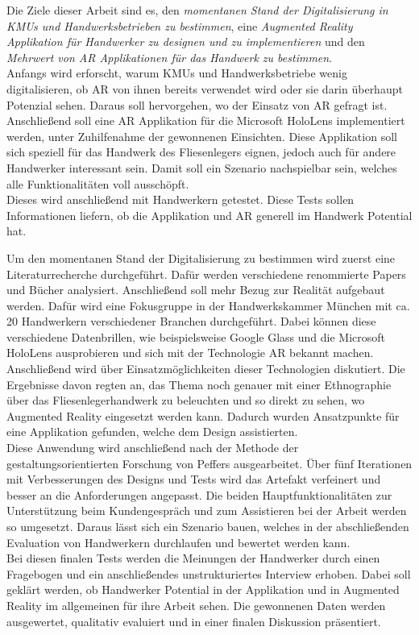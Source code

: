 Die Ziele dieser Arbeit sind es, den \textit{momentanen Stand der Digitalisierung in KMUs und Handwerksbetrieben zu bestimmen}, eine \textit{Augmented Reality Applikation für Handwerker zu designen und zu implementieren} und den \textit{Mehrwert von AR Applikationen für das Handwerk zu bestimmen}. \\
Anfangs wird erforscht, warum KMUs und Handwerksbetriebe wenig digitalisieren, ob AR von ihnen bereits verwendet wird oder sie darin überhaupt Potenzial sehen. Daraus soll hervorgehen, wo der Einsatz von AR gefragt ist. \\
Anschließend soll eine AR Applikation für die Microsoft HoloLens implementiert werden, unter Zuhilfenahme der gewonnenen Einsichten. Diese Applikation soll sich speziell für das Handwerk des Fliesenlegers eignen, jedoch auch für andere Handwerker interessant sein. Damit soll ein Szenario nachspielbar sein, welches alle Funktionalitäten voll ausschöpft. \\
Dieses wird anschließend mit Handwerkern getestet. Diese Tests sollen Informationen liefern, ob die Applikation und AR generell im Handwerk Potential hat.

Um den momentanen Stand der Digitalisierung zu bestimmen wird zuerst eine Literaturrecherche durchgeführt. Dafür werden verschiedene renommierte Papers und Bücher analysiert. Anschließend soll mehr Bezug zur Realität aufgebaut werden. Dafür wird eine Fokusgruppe in der Handwerkskammer München mit ca. 20 Handwerkern verschiedener Branchen durchgeführt. Dabei können diese verschiedene Datenbrillen, wie beispielsweise Google Glass und die Microsoft HoloLens ausprobieren und sich mit der Technologie AR bekannt machen. Anschließend wird über Einsatzmöglichkeiten dieser Technologien diskutiert. Die Ergebnisse davon regten an, das Thema noch genauer mit einer Ethnographie über das Fliesenlegerhandwerk zu beleuchten und so direkt zu sehen, wo Augmented Reality eingesetzt werden kann. Dadurch wurden Ansatzpunkte für eine Applikation gefunden, welche dem Design assistierten. \\
Diese Anwendung wird anschließend nach der Methode der gestaltungsorientierten Forschung von Peffers \cite{peffers_design_2007} ausgearbeitet. Über fünf Iterationen mit Verbesserungen des Designs und Tests wird das Artefakt verfeinert und besser an die Anforderungen angepasst. Die beiden Hauptfunktionalitäten zur Unterstützung beim Kundengespräch und zum Assistieren bei der Arbeit werden so umgesetzt. Daraus lässt sich ein Szenario bauen, welches in der abschließenden Evaluation von Handwerkern durchlaufen und bewertet werden kann. \\
Bei diesen finalen Tests werden die Meinungen der Handwerker durch einen Fragebogen und ein anschließendes unstrukturiertes Interview erhoben. Dabei soll geklärt werden, ob Handwerker Potential in der Applikation und in Augmented Reality im allgemeinen für ihre Arbeit sehen. Die gewonnenen Daten werden ausgewertet, qualitativ evaluiert und in einer finalen Diskussion präsentiert.

